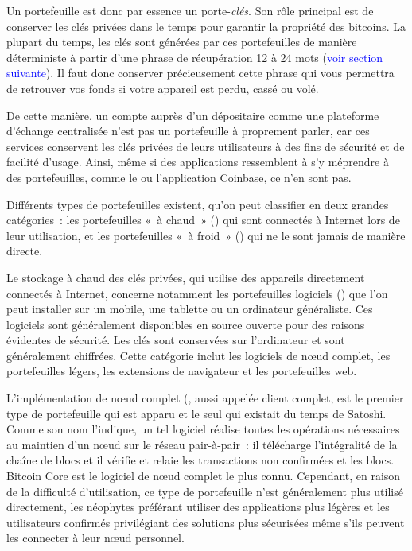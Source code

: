 Un portefeuille est donc par essence un porte-\emph{clés}. Son rôle principal est de conserver les clés privées dans le temps pour garantir la propriété des bitcoins. La plupart du temps, les clés sont générées par ces portefeuilles de manière déterministe à partir d'une phrase de récupération 12 à 24 mots (\textcolor{blue}{voir section suivante}). Il faut donc conserver précieusement cette phrase qui vous permettra de retrouver vos fonds si votre appareil est perdu, cassé ou volé.

De cette manière, un compte auprès d'un dépositaire comme une plateforme d'échange centralisée n'est pas un portefeuille à proprement parler, car ces services conservent les clés privées de leurs utilisateurs à des fins de sécurité et de facilité d'usage. Ainsi, même si des applications ressemblent à s'y méprendre à des portefeuilles, comme le  ou l'application Coinbase, ce n'en sont pas. 

Différents types de portefeuilles existent, qu'on peut classifier en deux grandes catégories~: les portefeuilles «~à chaud~» () qui sont connectés à Internet lors de leur utilisation, et les portefeuilles «~à froid~» () qui ne le sont jamais de manière directe.


Le stockage à chaud des clés privées, qui utilise des appareils directement connectés à Internet, concerne notamment les portefeuilles logiciels () que l'on peut installer sur un mobile, une tablette ou un ordinateur généraliste. Ces logiciels sont généralement disponibles en source ouverte pour des raisons évidentes de sécurité. Les clés sont conservées sur l'ordinateur et sont généralement chiffrées. Cette catégorie inclut les logiciels de nœud complet, les portefeuilles légers, les extensions de navigateur et les portefeuilles web.

L'implémentation de nœud complet (, aussi appelée client complet, est le premier type de portefeuille qui est apparu et le seul qui existait du temps de Satoshi. Comme son nom l'indique, un tel logiciel réalise toutes les opérations nécessaires au maintien d'un nœud sur le réseau pair-à-pair~: il télécharge l'intégralité de la chaîne de blocs et il vérifie et relaie les transactions non confirmées et les blocs. Bitcoin Core est le logiciel de nœud complet le plus connu. Cependant, en raison de la difficulté d'utilisation, ce type de portefeuille n'est généralement plus utilisé directement, les néophytes préférant utiliser des applications plus légères et les utilisateurs confirmés privilégiant des solutions plus sécurisées même s'ils peuvent les connecter à leur nœud personnel.


